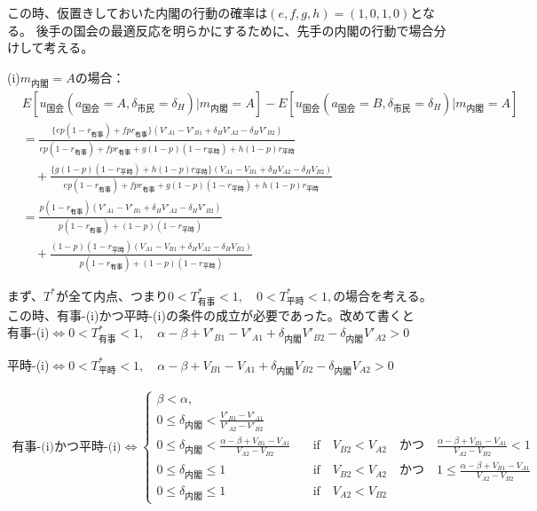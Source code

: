 \documentclass[main.tex]{subfiles}
\begin{document}
この時、仮置きしておいた内閣の行動の確率は$(e,f,g,h) = (1,0,1,0)$となる。
後手の国会の最適反応を明らかにするために、先手の内閣の行動で場合分けして考える。

(i)$m_{内閣}=A$の場合：
\begin{align*}
    & E[u_{国会}(a_{国会}=A, \delta_{市民}=\delta_H) | m_{内閣} = A  ] - E[u_{国会}(a_{国会}=B, \delta_{市民}=\delta_H) | m_{内閣} = A  ]\\[1em]
    &= \frac{ \{ep(1-r_{有事}) +  fpr_{有事}\}(V'_{A1} -V'_{B1} + \delta_H V'_{A2} - \delta_H V'_{B2})  }{ ep(1-r_{有事}) + fpr_{有事} + g(1-p)(1-r_{平時}) + h(1-p)r_{平時} }\\[1em]
    &\quad + \frac{ \{g(1-p)(1-r_{平時}) + h(1-p)r_{平時}\}(V_{A1} - V_{B1} + \delta_H V_{A2} - \delta_H V_{B2} ) }{ ep(1-r_{有事}) + fpr_{有事} + g(1-p)(1-r_{平時}) + h(1-p)r_{平時} }\\[1em]
    &= \frac{ p(1-r_{有事}) (V'_{A1} -V'_{B1} + \delta_H V'_{A2} - \delta_H V'_{B2})  }{ p(1-r_{有事})  + (1-p)(1-r_{平時}) }\\[1em]
    &\quad + \frac{ (1-p)(1-r_{平時})(V_{A1} - V_{B1} + \delta_H V_{A2} - \delta_H V_{B2} ) }{ p(1-r_{有事}) +  (1-p)(1-r_{平時}) }
\end{align*}

\bigskip
まず、$T^*$が全て内点、つまり$0<T^*_{有事}<1,\quad 0<T^*_{平時}<1,$の場合を考える。\\
この時、有事-(i)かつ平時-(i)の条件の成立が必要であった。改めて書くと\\

有事-(i)$\Leftrightarrow 0<T^*_{有事}<1,\quad \alpha-\beta + V'_{B1}-V'_{A1} + \delta_{内閣}V'_{B2} - \delta_{内閣}V'_{A2} > 0$

平時-(i)$\Leftrightarrow 0<T^*_{平時}<1,\quad \alpha-\beta + V_{B1}-V_{A1} + \delta_{内閣}V_{B2} - \delta_{内閣}V_{A2} > 0$

\begin{align*}
    \text{有事-(i)かつ平時-(i)} \Leftrightarrow 
    \begin{cases}
        \beta < \alpha, \\
        0 \le \delta_{内閣} < \frac{V'_{B1}-V'_{A1}}{V'_{A2} - V'_{B2}}\\
        0 \le \delta_{内閣} < \frac{\alpha-\beta + V_{B1}-V_{A1}}{V_{A2} - V_{B2}} \quad&\text{if}\quad V_{B2} < V_{A2} \quad{かつ}\quad \frac{\alpha-\beta + V_{B1}-V_{A1}}{V_{A2} - V_{B2}}<1\\
        0 \le \delta_{内閣} \le 1 \quad&\text{if}\quad V_{B2} < V_{A2} \quad{かつ}\quad 1 \le \frac{\alpha-\beta + V_{B1}-V_{A1}}{V_{A2} - V_{B2}}\\
        0 \le \delta_{内閣} \le 1 \quad&\text{if}\quad V_{A2} < V_{B2}
    \end{cases}
\end{align*}
\end{document}
